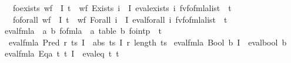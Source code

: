 \begin{isabellebody}
\ \ \ fo{\isacharunderscore}{\kern0pt}exists{\isacharcolon}{\kern0pt}\ {\isachardoublequoteopen}wf\ {\isasymphi}\ I\ t\ {\isasymLongrightarrow}\ wf\ {\isacharparenleft}{\kern0pt}Exists\ i\ {\isasymphi}{\isacharparenright}{\kern0pt}\ I\ {\isacharparenleft}{\kern0pt}eval{\isacharunderscore}{\kern0pt}exists\ i\ {\isacharparenleft}{\kern0pt}fv{\isacharunderscore}{\kern0pt}fo{\isacharunderscore}{\kern0pt}fmla{\isacharunderscore}{\kern0pt}list\ {\isasymphi}{\isacharparenright}{\kern0pt}\ t{\isacharparenright}{\kern0pt}{\isachardoublequoteclose}\isanewline
\ \ \ fo{\isacharunderscore}{\kern0pt}forall{\isacharcolon}{\kern0pt}\ {\isachardoublequoteopen}wf\ {\isasymphi}\ I\ t\ {\isasymLongrightarrow}\ wf\ {\isacharparenleft}{\kern0pt}Forall\ i\ {\isasymphi}{\isacharparenright}{\kern0pt}\ I\ {\isacharparenleft}{\kern0pt}eval{\isacharunderscore}{\kern0pt}forall\ i\ {\isacharparenleft}{\kern0pt}fv{\isacharunderscore}{\kern0pt}fo{\isacharunderscore}{\kern0pt}fmla{\isacharunderscore}{\kern0pt}list\ {\isasymphi}{\isacharparenright}{\kern0pt}\ t{\isacharparenright}{\kern0pt}{\isachardoublequoteclose}\isanewline
{}\isanewline
\isanewline
{}\isamarkupfalse%
\ eval{\isacharunderscore}{\kern0pt}fmla\ {\isacharcolon}{\kern0pt}{\isacharcolon}{\kern0pt}\ {\isachardoublequoteopen}{\isacharparenleft}{\kern0pt}{\isacharprime}{\kern0pt}a{\isacharcomma}{\kern0pt}\ {\isacharprime}{\kern0pt}b{\isacharparenright}{\kern0pt}\ fo{\isacharunderscore}{\kern0pt}fmla\ {\isasymRightarrow}\ {\isacharparenleft}{\kern0pt}{\isacharprime}{\kern0pt}a\ table{\isacharcomma}{\kern0pt}\ {\isacharprime}{\kern0pt}b{\isacharparenright}{\kern0pt}\ fo{\isacharunderscore}{\kern0pt}intp\ {\isasymRightarrow}\ {\isacharprime}{\kern0pt}t{\isachardoublequoteclose}\ \isanewline
\ \ {\isachardoublequoteopen}eval{\isacharunderscore}{\kern0pt}fmla\ {\isacharparenleft}{\kern0pt}Pred\ r\ ts{\isacharparenright}{\kern0pt}\ I\ {\isacharequal}{\kern0pt}\ abs\ ts\ {\isacharparenleft}{\kern0pt}I\ {\isacharparenleft}{\kern0pt}r{\isacharcomma}{\kern0pt}\ length\ ts{\isacharparenright}{\kern0pt}{\isacharparenright}{\kern0pt}{\isachardoublequoteclose}\isanewline
{\isacharbar}{\kern0pt}\ {\isachardoublequoteopen}eval{\isacharunderscore}{\kern0pt}fmla\ {\isacharparenleft}{\kern0pt}Bool\ b{\isacharparenright}{\kern0pt}\ I\ {\isacharequal}{\kern0pt}\ eval{\isacharunderscore}{\kern0pt}bool\ b{\isachardoublequoteclose}\isanewline
{\isacharbar}{\kern0pt}\ {\isachardoublequoteopen}eval{\isacharunderscore}{\kern0pt}fmla\ {\isacharparenleft}{\kern0pt}Eqa\ t\ t{\isacharprime}{\kern0pt}{\isacharparenright}{\kern0pt}\ I\ {\isacharequal}{\kern0pt}\ eval{\isacharunderscore}{\kern0pt}eq\ t\ t{\isacharprime}{\kern0pt}{\isachardoublequoteclose}\isanewline

\end{isabellebody}
